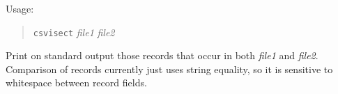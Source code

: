 \documentclass[12pt,fleqn]{article}
\begin{document}
Usage:
\begin{quote}
  \texttt{csvisect} \textit{file1} \textit{file2}
\end{quote}
Print on standard output those records that occur in both
\textit{file1} and \textit{file2}.  Comparison of records currently
just uses string equality, so it is sensitive to whitespace between
record fields. 





\end{document}
